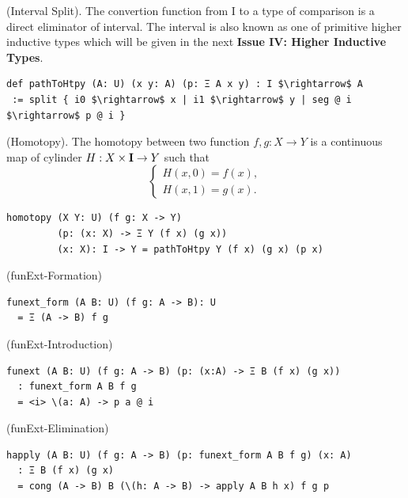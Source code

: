\documentclass{article}
\begin{document}
\begin{definition} (Interval Split).
The convertion function from $\mathrm{I}$ to a type of comparison
is a direct eliminator of interval. The interval is also known as one of
primitive higher inductive types which will be given in the next
{\bf Issue IV: Higher Inductive Types}.
\begin{lstlisting}[mathescape=true]
def pathToHtpy (A: U) (x y: A) (p: Ξ A x y) : I $\rightarrow$ A
 := split { i0 $\rightarrow$ x | i1 $\rightarrow$ y | seg @ i $\rightarrow$ p @ i }
\end{lstlisting}
\end{definition}

\begin{definition} (Homotopy). The homotopy between two function $f,g: X \rightarrow Y$
is a continuous map of cylinder $H : X \times {\bf I} \rightarrow Y$ such that
$$
\begin{cases}
H(x,0)=f(x), \\
H(x,1)=g(x).
\end{cases}
$$
\begin{lstlisting}
homotopy (X Y: U) (f g: X -> Y)
         (p: (x: X) -> Ξ Y (f x) (g x))
         (x: X): I -> Y = pathToHtpy Y (f x) (g x) (p x)
\end{lstlisting}
\end{definition}

\newpage
\begin{definition} (funExt-Formation)
\begin{lstlisting}
funext_form (A B: U) (f g: A -> B): U
  = Ξ (A -> B) f g
\end{lstlisting}
\end{definition}

\begin{definition} (funExt-Introduction)
\begin{lstlisting}
funext (A B: U) (f g: A -> B) (p: (x:A) -> Ξ B (f x) (g x))
  : funext_form A B f g
  = <i> \(a: A) -> p a @ i
\end{lstlisting}
\end{definition}

\begin{definition} (funExt-Elimination)
\begin{lstlisting}
happly (A B: U) (f g: A -> B) (p: funext_form A B f g) (x: A)
  : Ξ B (f x) (g x)
  = cong (A -> B) B (\(h: A -> B) -> apply A B h x) f g p
\end{lstlisting}
\end{definition}
\end{document}
